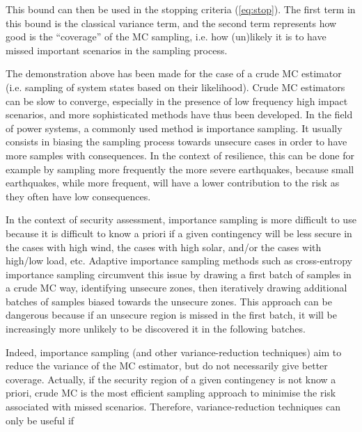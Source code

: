 
This bound can then be used in the stopping criteria (\ref{eq:stop}). The first term in this bound is the classical variance term, and the second term represents how good is the ``coverage'' of the MC sampling, i.e. how (un)likely it is to have missed important scenarios in the sampling process.


The demonstration above has been made for the case of a crude MC estimator (i.e. sampling of system states based on their likelihood). Crude MC estimators can be slow to converge, especially in the presence of low frequency high impact scenarios, and more sophisticated methods have thus been developed. In the field of power systems, a commonly used method is importance sampling. It usually consists in biasing the sampling process towards unsecure cases in order to have more samples with consequences. In the context of resilience, this can be done for example by sampling more frequently the more severe earthquakes, because small earthquakes, while more frequent, will have a lower contribution to the risk as they often have low consequences.

In the context of security assessment, importance sampling is more difficult to use because it is difficult to know a priori if a given contingency will be less secure in the cases with high wind, the cases with high solar, and/or the cases with high/low load, etc. Adaptive importance sampling methods such as cross-entropy importance sampling circumvent this issue by drawing a first batch of samples in a crude MC way, identifying unsecure zones, then iteratively drawing additional batches of samples biased towards the unsecure zones. This approach can be dangerous because if an unsecure region is missed in the first batch, it will be increasingly more unlikely to be discovered it in the following batches.

Indeed, importance sampling (and other variance-reduction techniques) aim to reduce the variance of the MC estimator, but do not necessarily give better coverage. Actually, if the security region of a given contingency is not know a priori, crude MC is the most efficient sampling approach to minimise the risk associated with missed scenarios. Therefore, variance-reduction techniques can only be useful if

